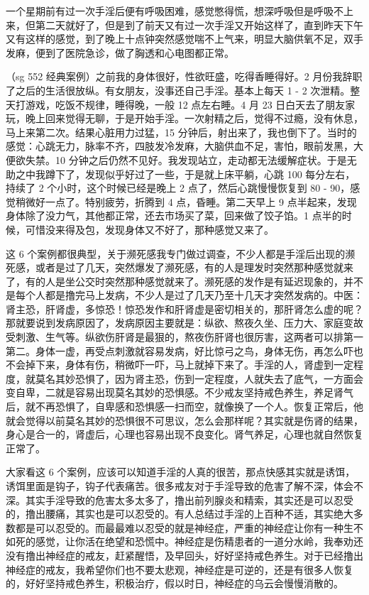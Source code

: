 \begin{case}[濒死感]
    一个星期前有过一次手淫后便有呼吸困难，感觉憋得慌，想深呼吸但是呼吸不上来，但第二天就好了，但是到了前天又有过一次手淫又开始这样了，直到昨天下午又有这样的感觉，到了晚上十点钟突然感觉喘不上气来，明显大脑供氧不足，双手发麻，便到了医院急诊，做了胸透和心电图都正常。
\end{case}

\begin{case}[濒死感]
    （sg 552 经典案例）之前我的身体很好，性欲旺盛，吃得香睡得好。2 月份我辞职了之后的生活很放纵。有女朋友，没事还自己手淫。基本上每天 1 - 2 次泄精。整天打游戏，吃饭不规律，睡得晚，一般 12 点左右睡。4 月 23 日白天去了朋友家玩，晚上回来觉得无聊，于是开始手淫。一次射精之后，觉得不过瘾，没有休息，马上来第二次。结果心脏用力过猛，15 分钟后，射出来了，我也倒下了。当时的感觉：心跳无力，脉率不齐，四肢发冷发麻，大脑供血不足，害怕，眼前发黑，大便欲失禁。10 分钟之后仍然不见好。我发现站立，走动都无法缓解症状。于是无助之中我蹲下了，发现似乎好过了一些，于是就上床平躺，心跳 100 每分左右，持续了 2 个小时，这个时候已经是晚上 2 点了，然后心跳慢慢恢复到 80 - 90，感觉稍微好一点了。特别疲劳，折腾到 4 点，昏睡。第二天早上 9 点半起来，发现身体除了没力气，其他都正常，还去市场买了菜，回来做了饺子馅。1 点半的时候，可惜没来得及包，发现身体又不好了，那种感觉又来了。
\end{case}

这 6 个案例都很典型，关于濒死感我专门做过调查，不少人都是手淫后出现的濒死感，或者是过了几天，突然爆发了濒死感，有的人是理发时突然那种感觉就来了，有的人是坐公交时突然那种感觉就来了。濒死感的发作是有延迟现象的，并不是每个人都是撸完马上发病，不少人是过了几天乃至十几天才突然发病的。中医：肾主恐，肝肾虚，多惊恐！惊恐发作和肝肾虚是密切相关的，那肝肾怎么虚的呢？那就要说到发病原因了，发病原因主要就是：纵欲、熬夜久坐、压力大、家庭变故受刺激、生气等。纵欲伤肝肾是最狠的，熬夜伤肝肾也很厉害，这两者可以排第一第二。身体一虚，再受点刺激就容易发病，好比惊弓之鸟，身体无伤，再怎么吓也不会掉下来，身体有伤，稍微吓一吓，马上就掉下来了。手淫的人，肾虚到一定程度，就莫名其妙恐惧了，因为肾主恐，伤到一定程度，人就失去了底气，一方面会变自卑，二就是容易出现莫名其妙的恐惧感。不少戒友坚持戒色养生，养足肾气后，就不再恐惧了，自卑感和恐惧感一扫而空，就像换了一个人。恢复正常后，他就会觉得以前莫名其妙的恐惧很不可思议，怎么会那样呢？其实就是伤肾的结果，身心是合一的，肾虚后，心理也容易出现不良变化。肾气养足，心理也就自然恢复正常了。

大家看这 6 个案例，应该可以知道手淫的人真的很苦，那点快感其实就是诱饵，诱饵里面是钩子，钩子代表痛苦。很多戒友对于手淫导致的危害了解不深，体会不深。其实手淫导致的危害太多太多了，撸出前列腺炎和精索，其实还是可以忍受的，撸出腰痛，其实也是可以忍受的。有人总结过手淫的上百种不适，其实绝大多数都是可以忍受的。而最最难以忍受的就是神经症，严重的神经症让你有一种生不如死的感觉，让你活在绝望和恐慌中。神经症是伤精患者的一道分水岭，我奉劝还没有撸出神经症的戒友，赶紧醒悟，及早回头，好好坚持戒色养生。对于已经撸出神经症的戒友，我希望你们也不要太悲观，神经症是可逆的，还是有很多人恢复的，好好坚持戒色养生，积极治疗，假以时日，神经症的乌云会慢慢消散的。

